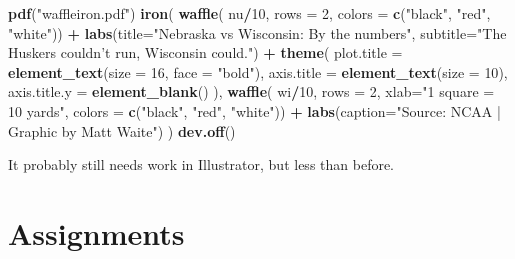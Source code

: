 \documentclass[]{book}
\newenvironment{Shaded}{\begin{snugshade}}{\end{snugshade}}
\newcommand{\KeywordTok}[1]{\textcolor[rgb]{0.13,0.29,0.53}{\textbf{#1}}}
\newcommand{\DataTypeTok}[1]{\textcolor[rgb]{0.13,0.29,0.53}{#1}}
\newcommand{\DecValTok}[1]{\textcolor[rgb]{0.00,0.00,0.81}{#1}}
\newcommand{\StringTok}[1]{\textcolor[rgb]{0.31,0.60,0.02}{#1}}
\newcommand{\OperatorTok}[1]{\textcolor[rgb]{0.81,0.36,0.00}{\textbf{#1}}}
\newcommand{\NormalTok}[1]{#1}
\begin{document}
\begin{Shaded}
\begin{Highlighting}[]
\KeywordTok{pdf}\NormalTok{(}\StringTok{"waffleiron.pdf"}\NormalTok{)}
\KeywordTok{iron}\NormalTok{(}
 \KeywordTok{waffle}\NormalTok{(}
\NormalTok{   nu}\OperatorTok{/}\DecValTok{10}\NormalTok{, }
   \DataTypeTok{rows =} \DecValTok{2}\NormalTok{, }
   \DataTypeTok{colors =} \KeywordTok{c}\NormalTok{(}\StringTok{"black"}\NormalTok{, }\StringTok{"red"}\NormalTok{, }\StringTok{"white"}\NormalTok{)) }\OperatorTok{+}\StringTok{ }
\StringTok{   }\KeywordTok{labs}\NormalTok{(}\DataTypeTok{title=}\StringTok{"Nebraska vs Wisconsin: By the numbers"}\NormalTok{, }\DataTypeTok{subtitle=}\StringTok{"The Huskers couldn't run, Wisconsin could."}\NormalTok{) }\OperatorTok{+}\StringTok{ }
\StringTok{   }\KeywordTok{theme}\NormalTok{(}
    \DataTypeTok{plot.title =} \KeywordTok{element_text}\NormalTok{(}\DataTypeTok{size =} \DecValTok{16}\NormalTok{, }\DataTypeTok{face =} \StringTok{"bold"}\NormalTok{),}
    \DataTypeTok{axis.title =} \KeywordTok{element_text}\NormalTok{(}\DataTypeTok{size =} \DecValTok{10}\NormalTok{),}
    \DataTypeTok{axis.title.y =} \KeywordTok{element_blank}\NormalTok{()}
\NormalTok{  ),}
 \KeywordTok{waffle}\NormalTok{(}
\NormalTok{   wi}\OperatorTok{/}\DecValTok{10}\NormalTok{, }
   \DataTypeTok{rows =} \DecValTok{2}\NormalTok{, }
   \DataTypeTok{xlab=}\StringTok{"1 square = 10 yards"}\NormalTok{, }
   \DataTypeTok{colors =} \KeywordTok{c}\NormalTok{(}\StringTok{"black"}\NormalTok{, }\StringTok{"red"}\NormalTok{, }\StringTok{"white"}\NormalTok{)) }\OperatorTok{+}\StringTok{ }\KeywordTok{labs}\NormalTok{(}\DataTypeTok{caption=}\StringTok{"Source: NCAA | Graphic by Matt Waite"}\NormalTok{)}
\NormalTok{) }
\KeywordTok{dev.off}\NormalTok{()}
\end{Highlighting}
\end{Shaded}

It probably still needs work in Illustrator, but less than before.

\chapter{Assignments}\label{assignments}
\end{document}
